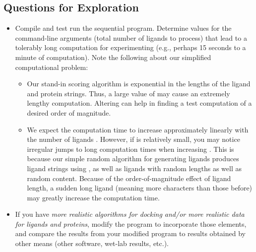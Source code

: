 \documentclass[letterpaper,10pt,openany,oneside]{sphinxmanual}
\begin{document}
\subsection{Questions for Exploration}
\label{sequentialimplementation/sequentialimplementation:questions-for-exploration}\label{sequentialimplementation/sequentialimplementation:stl-containers}\begin{itemize}
\item {} 
Compile and test run the sequential program. Determine values for the command-line arguments  (total number of ligands to process) that lead to a tolerably long computation for experimenting (e.g., perhaps 15 seconds to a minute of computation). Note the following about our simplified computational problem:
\begin{itemize}
\item {} 
Our stand-in scoring algorithm is exponential in the lengths of the ligand and protein strings. Thus, a large value of  may cause an extremely lengthy computation. Altering  can help in finding a test computation of a desired order of magnitude.

\item {} 
We expect the computation time to increase approximately linearly with the number of ligands . However, if  is relatively small, you may notice irregular jumps to long computation times when increasing . This is because our simple random algorithm for generating ligands produces ligand strings using , as well as ligands with random lengths as well as random content.  Because of the order-of-magnitude effect of ligand length, a sudden long ligand (meaning more characters than those before) may greatly increase the computation time.

\end{itemize}

\item {} 
If you have \emph{more realistic algorithms for docking and/or more realistic data for ligands and proteins}, modify the program to incorporate those elements, and compare the results from your modified program to results obtained by other means (other software, wet-lab results, etc.).

\end{itemize}



\renewcommand{\indexname}{Index}
\printindex
\end{document}
